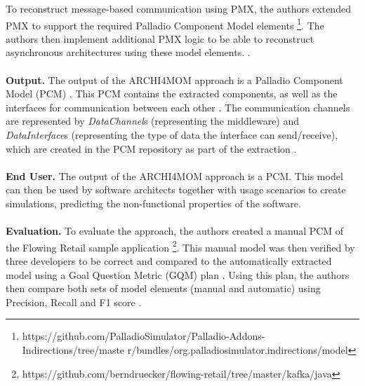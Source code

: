 To reconstruct message-based communication using PMX, the authors extended PMX to support the required Palladio Component Model elements \footnote{https://github.com/PalladioSimulator/Palladio-Addons-Indirections/tree/maste r/bundles/org.palladiosimulator.indirections/model}.
The authors then implement additional PMX logic to be able to reconstruct asynchronous architectures using these model elements.
\cite{Singh2022ARCHI4MOM}.
\\ \\
\textbf{Output.}
The output of the ARCHI4MOM approach is a Palladio Component Model (PCM) \cite{Singh2022ARCHI4MOM}.
This PCM contains the extracted components, as well as the interfaces for communication between each other \cite{Singh2022ARCHI4MOM}.
The communication channels are represented by \textit{DataChannel}s (representing the middleware) and \textit{DataInterface}s (representing the type of data the interface can send/receive), which are created in the PCM repository as part of the extraction \cite{Singh2022ARCHI4MOM}.
\\ \\
\textbf{End User.}
The output of the ARCHI4MOM approach is a PCM.
This model can then be used by software architects together with usage scenarios to create simulations, predicting the non-functional properties of the software.
\\ \\
\textbf{Evaluation.}
To evaluate the approach, the authors created a manual PCM of the Flowing Retail sample application \footnote{https://github.com/berndruecker/flowing-retail/tree/master/kafka/java}.
This manual model was then verified by three developers to be correct and compared to the automatically extracted model using a Goal Question Metric (GQM) plan \cite{VanSolingen2002GQM,Singh2022ARCHI4MOM}.
Using this plan, the authors then compare both sets of model elements (manual and automatic) using Precision, Recall and F1 score \cite{Singh2022ARCHI4MOM}.



